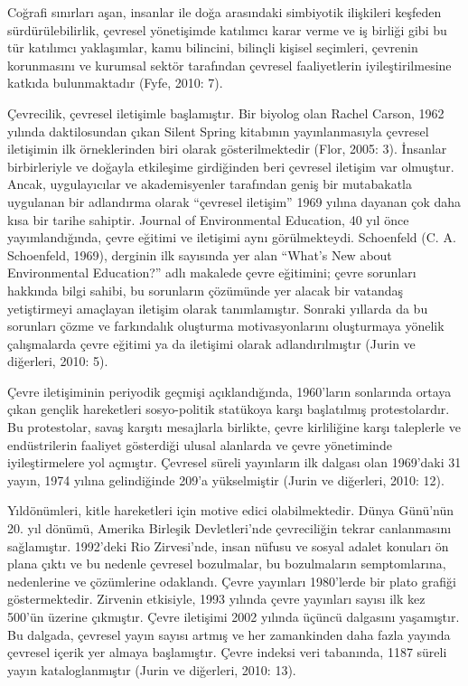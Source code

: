 \documentclass[
]{book}
\begin{document}
Coğrafi sınırları aşan, insanlar ile doğa arasındaki simbiyotik ilişkileri keşfeden sürdürülebilirlik, çevresel yönetişimde katılımcı karar verme ve iş birliği gibi bu tür katılımcı yaklaşımlar, kamu bilincini, bilinçli kişisel seçimleri, çevrenin korunmasını ve kurumsal sektör tarafından çevresel faaliyetlerin iyileştirilmesine katkıda bulunmaktadır (Fyfe, 2010: 7).

Çevrecilik, çevresel iletişimle başlamıştır. Bir biyolog olan Rachel Carson, 1962 yılında daktilosundan çıkan Silent Spring kitabının yayınlanmasıyla çevresel iletişimin ilk örneklerinden biri olarak gösterilmektedir (Flor, 2005: 3). İnsanlar birbirleriyle ve doğayla etkileşime girdiğinden beri çevresel iletişim var olmuştur. Ancak, uygulayıcılar ve akademisyenler tarafından geniş bir mutabakatla uygulanan bir adlandırma olarak ``çevresel iletişim'' 1969 yılına dayanan çok daha kısa bir tarihe sahiptir. Journal of Environmental Education, 40 yıl önce yayımlandığında, çevre eğitimi ve iletişimi aynı görülmekteydi. Schoenfeld (C. A. Schoenfeld, 1969), derginin ilk sayısında yer alan ``What's New about Environmental Education?'' adlı makalede çevre eğitimini; çevre sorunları hakkında bilgi sahibi, bu sorunların çözümünde yer alacak bir vatandaş yetiştirmeyi amaçlayan iletişim olarak tanımlamıştır. Sonraki yıllarda da bu sorunları çözme ve farkındalık oluşturma motivasyonlarını oluşturmaya yönelik çalışmalarda çevre eğitimi ya da iletişimi olarak adlandırılmıştır (Jurin ve diğerleri, 2010: 5).

Çevre iletişiminin periyodik geçmişi açıklandığında, 1960'ların sonlarında ortaya çıkan gençlik hareketleri sosyo-politik statükoya karşı başlatılmış protestolardır. Bu protestolar, savaş karşıtı mesajlarla birlikte, çevre kirliliğine karşı taleplerle ve endüstrilerin faaliyet gösterdiği ulusal alanlarda ve çevre yönetiminde iyileştirmelere yol açmıştır. Çevresel süreli yayınların ilk dalgası olan 1969'daki 31 yayın, 1974 yılına gelindiğinde 209'a yükselmiştir (Jurin ve diğerleri, 2010: 12).

Yıldönümleri, kitle hareketleri için motive edici olabilmektedir. Dünya Günü'nün 20. yıl dönümü, Amerika Birleşik Devletleri'nde çevreciliğin tekrar canlanmasını sağlamıştır. 1992'deki Rio Zirvesi'nde, insan nüfusu ve sosyal adalet konuları ön plana çıktı ve bu nedenle çevresel bozulmalar, bu bozulmaların semptomlarına, nedenlerine ve çözümlerine odaklandı. Çevre yayınları 1980'lerde bir plato grafiği göstermektedir. Zirvenin etkisiyle, 1993 yılında çevre yayınları sayısı ilk kez 500'ün üzerine çıkmıştır. Çevre iletişimi 2002 yılında üçüncü dalgasını yaşamıştır. Bu dalgada, çevresel yayın sayısı artmış ve her zamankinden daha fazla yayında çevresel içerik yer almaya başlamıştır. Çevre indeksi veri tabanında, 1187 süreli yayın kataloglanmıştır (Jurin ve diğerleri, 2010: 13).
\end{document}
